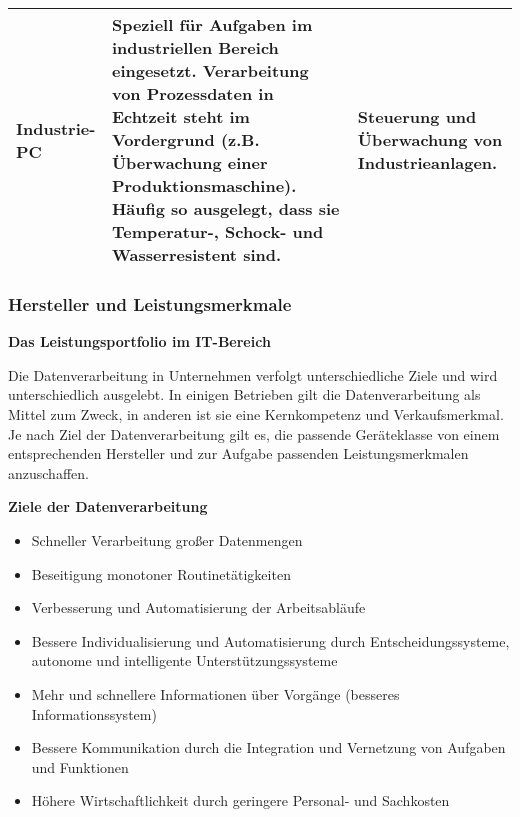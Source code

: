 \documentclass[asp1.tex]{subfiles}
\begin{document}
\begin{longtable}{|p{}|p{}|p{}|}
    \textbf{Industrie-PC}      & Speziell für Aufgaben im industriellen Bereich eingesetzt. Verarbeitung von Prozessdaten in Echtzeit steht im Vordergrund (z.B. Überwachung einer Produktionsmaschine). \newline Häufig so ausgelegt, dass sie Temperatur-, Schock- und Wasserresistent sind.                                                                    & Steuerung und Überwachung von Industrieanlagen.

    \\\hline
\end{longtable}

\break

\subsubsection{Hersteller und Leistungsmerkmale}

\textbf{Das Leistungsportfolio im IT-Bereich}

Die Datenverarbeitung in Unternehmen verfolgt unterschiedliche Ziele und wird unterschiedlich ausgelebt. In einigen Betrieben gilt die Datenverarbeitung als Mittel zum Zweck, in anderen ist sie eine Kernkompetenz und Verkaufsmerkmal.
Je nach Ziel der Datenverarbeitung gilt es, die passende Geräteklasse von einem entsprechenden Hersteller und zur Aufgabe passenden Leistungsmerkmalen anzuschaffen.

\textbf{Ziele der Datenverarbeitung}
\begin{itemize}
    \item   Schneller Verarbeitung großer Datenmengen
    \item   Beseitigung monotoner Routinetätigkeiten
    \item   Verbesserung und Automatisierung der Arbeitsabläufe
    \item   Bessere Individualisierung und Automatisierung durch Entscheidungssysteme, autonome und intelligente Unterstützungssysteme
    \item   Mehr und schnellere Informationen über Vorgänge (besseres Informationssystem)
    \item   Bessere Kommunikation durch die Integration und Vernetzung von Aufgaben und Funktionen
    \item Höhere Wirtschaftlichkeit durch geringere Personal- und Sachkosten

\end{itemize}
\end{document}
